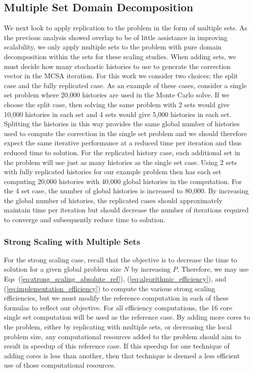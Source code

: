 \documentclass{snamc2013}
\begin{document}
\subsection{Multiple Set Domain Decomposition}
\label{subsec:ms_decomposition}

We next look to apply replication to the problem in the form of
multiple sets. As the previous analysis showed overlap to be of little
assistance in improving scalability, we only apply multiple sets to
the problem with pure domain decomposition within the sets for these
scaling studies. When adding sets, we must decide how many stochastic
histories to use to generate the correction vector in the MCSA
iteration. For this work we consider two choices; the split case and
the fully replicated case. As an example of these cases, consider a
single set problem where 20,000 histories are used in the Monte Carlo
solve. If we choose the split case, then solving the same problem with
2 sets would give 10,000 histories in each set and 4 sets would give
5,000 histories in each set. Splitting the histories in this way
provides the same global number of histories used to compute the
correction in the single set problem and we should therefore expect
the same iterative performance at a reduced time per iteration and
thus reduced time to solution. For the replicated history case, each
additional set in the problem will use just as many histories as the
single set case. Using 2 sets with fully replicated histories for our
example problem then has each set computing 20,000 histories with
40,000 global histories in the computation. For the 4 set case, the
number of global histories is increased to 80,000. By increasing the
global number of histories, the replicated cases should approximately
maintain time per iteration but should decrease the number of
iterations required to converge and subsequently reduce time to
solution.

\subsubsection{Strong Scaling with Multiple Sets}
\label{subsubsec:ms_strong}

For the strong scaling case, recall that the objective is to decrease
the time to solution for a given global problem size $N$ by increasing
$P$. Therefore, we may use Eqs~(\ref{eq:strong_scaling_absolute_ref}),
(\ref{eq:algorithmic_efficiency}), and
(\ref{eq:implementation_efficiency}) to compute the various strong
scaling efficiencies, but we must modify the reference computation in
each of these formulas to reflect our objective. For all efficiency
computations, the 16 core single set computation will be used as the
reference case. By adding more cores to the problem, either by
replicating with multiple sets, or decreasing the local problem size,
any computational resources added to the problem should aim to result
in speedup of this reference case. If this speedup for one technique
of adding cores is less than another, then that technique is deemed a
less efficient use of those computational resources.
\end{document}
